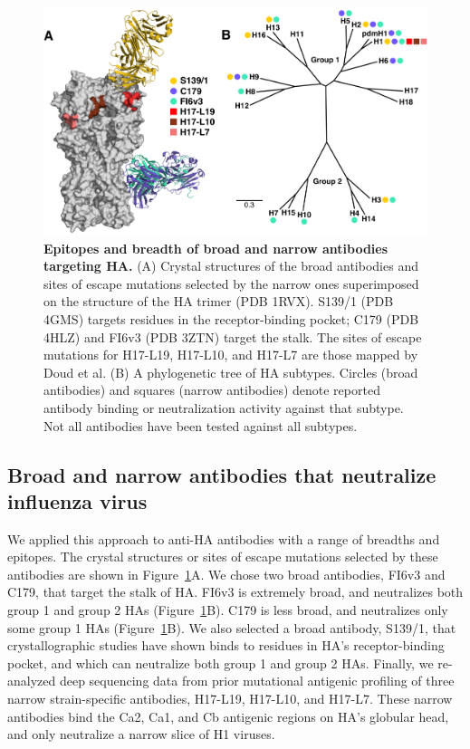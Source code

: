 \documentclass[11pt]{article}
\begin{document}
\begin{figure}
\centerline{\includegraphics[width=\textwidth]{figs/antibody_summary_fig/Ab_summary.pdf}}
\caption{\label{fig:antibody_summary}
{\bf Epitopes and breadth of broad and narrow antibodies targeting HA.}
(A) Crystal structures of the broad antibodies and sites of escape mutations selected by the narrow ones superimposed on the structure of the HA trimer (PDB 1RVX\cite{gamblin2004structure}). 
S139/1 (PDB 4GMS\cite{lee2012heterosubtypic}) targets residues in the receptor-binding pocket; C179 (PDB 4HLZ\cite{dreyfus2013structure}) and FI6v3 (PDB 3ZTN\cite{corti2011neutralizing}) target the stalk. 
The sites of escape mutations for H17-L19, H17-L10, and H17-L7 are those mapped by Doud et al\cite{doud2017complete}. 
(B) A phylogenetic tree of HA subtypes.
Circles (broad antibodies) and squares (narrow antibodies) denote reported antibody binding or neutralization activity against that subtype. 
Not all antibodies have been tested against all subtypes. 
}
\end{figure}

\subsection*{Broad and narrow antibodies that neutralize influenza virus}
We applied this approach to anti-HA antibodies with a range of breadths and epitopes.
The crystal structures or sites of escape mutations selected by these antibodies are shown in Figure~\ref{fig:antibody_summary}A.
We chose two broad antibodies, FI6v3 and C179, that target the stalk of HA\cite{corti2011neutralizing, okuno1993common, dreyfus2013structure}. 
FI6v3 is extremely broad, and neutralizes both group 1 and group 2 HAs (Figure~\ref{fig:antibody_summary}B).
C179 is less broad, and neutralizes only some group 1 HAs (Figure~\ref{fig:antibody_summary}B).
We also selected a broad antibody, S139/1, that crystallographic studies have shown binds to residues in HA's receptor-binding pocket\cite{lee2012heterosubtypic}, and which can neutralize both group 1 and group 2 HAs\cite{yoshida2009cross, lee2012heterosubtypic}.
Finally, we re-analyzed deep sequencing data from prior mutational antigenic profiling of three narrow strain-specific antibodies, H17-L19, H17-L10, and H17-L7\cite{doud2017complete}.
These narrow antibodies bind the Ca2, Ca1, and Cb antigenic regions on HA's globular head\cite{caton1982antigenic}, and only neutralize a narrow slice of H1 viruses.
\end{document}

